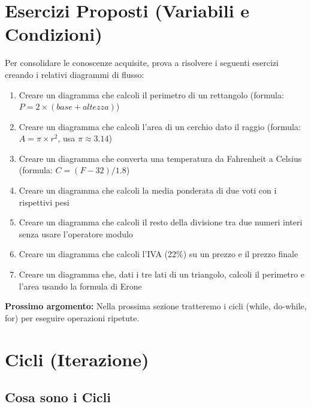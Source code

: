 \documentclass[a4paper,16pt]{article}
\begin{document}
\newpage
\section{Esercizi Proposti (Variabili e Condizioni)}

Per consolidare le conoscenze acquisite, prova a risolvere i seguenti esercizi creando i relativi diagrammi di flusso:

\begin{enumerate}[leftmargin=*]
    \item Creare un diagramma che calcoli il perimetro di un rettangolo (formula: $P = 2 \times (base + altezza)$)
    
    \item Creare un diagramma che calcoli l'area di un cerchio dato il raggio (formula: $A = \pi \times r^2$, usa $\pi \approx 3.14$)
    
    \item Creare un diagramma che converta una temperatura da Fahrenheit a Celsius (formula: $C = (F - 32) / 1.8$)
    
    \item Creare un diagramma che calcoli la media ponderata di due voti con i rispettivi pesi
    
    \item Creare un diagramma che calcoli il resto della divisione tra due numeri interi senza usare l'operatore modulo
    
    \item Creare un diagramma che calcoli l'IVA (22\%) su un prezzo e il prezzo finale
    
    \item Creare un diagramma che, dati i tre lati di un triangolo, calcoli il perimetro e l'area usando la formula di Erone
\end{enumerate}

\vspace{1cm}
\begin{tcolorbox}[colback=yellow!10!white,colframe=orange!75!black,title=Nota]
\textbf{Prossimo argomento:} Nella prossima sezione tratteremo i cicli (while, do-while, for) per eseguire operazioni ripetute.
\end{tcolorbox}

\newpage
\section{Cicli (Iterazione)}

\subsection{Cosa sono i Cicli}
\end{document}
